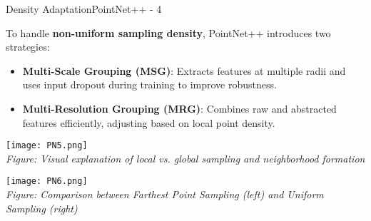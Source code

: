 \documentclass{beamer}
\begin{document}
\begin{frame}{Density Adaptation}{PointNet++ - 4}

\vspace{0.5em}
To handle \textbf{non-uniform sampling density}, PointNet++ introduces two strategies:
\begin{itemize}
    \item \textbf{Multi-Scale Grouping (MSG)}: Extracts features at multiple radii and uses input dropout during training to improve robustness.
    \item \textbf{Multi-Resolution Grouping (MRG)}: Combines raw and abstracted features efficiently, adjusting based on local point density.
\end{itemize}

\vspace{1em}

\begin{center}
    \texttt{[image: PN5.png]} \\
    \scriptsize \textit{Figure: Visual explanation of local vs. global sampling and neighborhood formation}
\end{center}

\vspace{1em}

\begin{center}
    \texttt{[image: PN6.png]} \\
    \scriptsize \textit{Figure: Comparison between Farthest Point Sampling (left) and Uniform Sampling (right)}
\end{center}

\end{frame}
\end{document}
